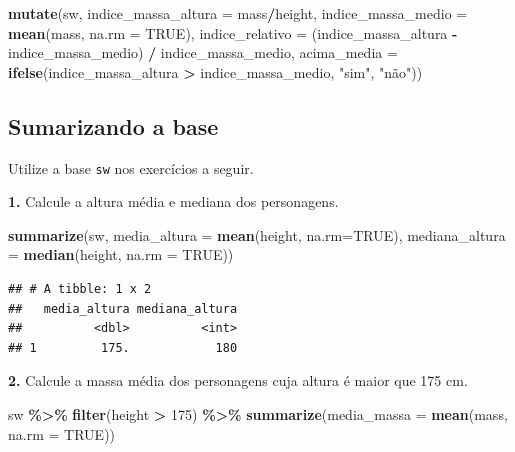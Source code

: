 \documentclass[
]{book}
\newenvironment{Shaded}{\begin{snugshade}}{\end{snugshade}}
\newcommand{\AttributeTok}[1]{\textcolor[rgb]{0.13,0.29,0.53}{#1}}
\newcommand{\ConstantTok}[1]{\textcolor[rgb]{0.56,0.35,0.01}{#1}}
\newcommand{\DecValTok}[1]{\textcolor[rgb]{0.00,0.00,0.81}{#1}}
\newcommand{\FunctionTok}[1]{\textcolor[rgb]{0.13,0.29,0.53}{\textbf{#1}}}
\newcommand{\NormalTok}[1]{#1}
\newcommand{\SpecialCharTok}[1]{\textcolor[rgb]{0.81,0.36,0.00}{\textbf{#1}}}
\newcommand{\StringTok}[1]{\textcolor[rgb]{0.31,0.60,0.02}{#1}}
\begin{document}
\begin{Shaded}
\begin{Highlighting}[]
\FunctionTok{mutate}\NormalTok{(sw, }
       \AttributeTok{indice\_massa\_altura =}\NormalTok{ mass}\SpecialCharTok{/}\NormalTok{height,}
       \AttributeTok{indice\_massa\_medio =} \FunctionTok{mean}\NormalTok{(mass, }\AttributeTok{na.rm =} \ConstantTok{TRUE}\NormalTok{),}
       \AttributeTok{indice\_relativo =}\NormalTok{ (indice\_massa\_altura }\SpecialCharTok{{-}}\NormalTok{ indice\_massa\_medio) }\SpecialCharTok{/}\NormalTok{ indice\_massa\_medio,}
       \AttributeTok{acima\_media =} \FunctionTok{ifelse}\NormalTok{(indice\_massa\_altura }\SpecialCharTok{\textgreater{}}\NormalTok{ indice\_massa\_medio, }\StringTok{"sim"}\NormalTok{, }\StringTok{"não"}\NormalTok{))}
\end{Highlighting}
\end{Shaded}

\subsection{Sumarizando a base}\label{sumarizando-a-base}

Utilize a base \texttt{sw} nos exercícios a seguir.

\textbf{1.} Calcule a altura média e mediana dos personagens.

\begin{Shaded}
\begin{Highlighting}[]
\FunctionTok{summarize}\NormalTok{(sw, }
          \AttributeTok{media\_altura =} \FunctionTok{mean}\NormalTok{(height, }\AttributeTok{na.rm=}\ConstantTok{TRUE}\NormalTok{),}
          \AttributeTok{mediana\_altura =} \FunctionTok{median}\NormalTok{(height, }\AttributeTok{na.rm =} \ConstantTok{TRUE}\NormalTok{))}
\end{Highlighting}
\end{Shaded}

\begin{verbatim}
## # A tibble: 1 x 2
##   media_altura mediana_altura
##          <dbl>          <int>
## 1         175.            180
\end{verbatim}

\textbf{2.} Calcule a massa média dos personagens cuja altura é maior que 175
cm.

\begin{Shaded}
\begin{Highlighting}[]
\NormalTok{sw }\SpecialCharTok{\%\textgreater{}\%} 
  \FunctionTok{filter}\NormalTok{(height }\SpecialCharTok{\textgreater{}} \DecValTok{175}\NormalTok{) }\SpecialCharTok{\%\textgreater{}\%} 
  \FunctionTok{summarize}\NormalTok{(}\AttributeTok{media\_massa =} \FunctionTok{mean}\NormalTok{(mass, }\AttributeTok{na.rm =} \ConstantTok{TRUE}\NormalTok{))}
\end{Highlighting}
\end{Shaded}
\end{document}
